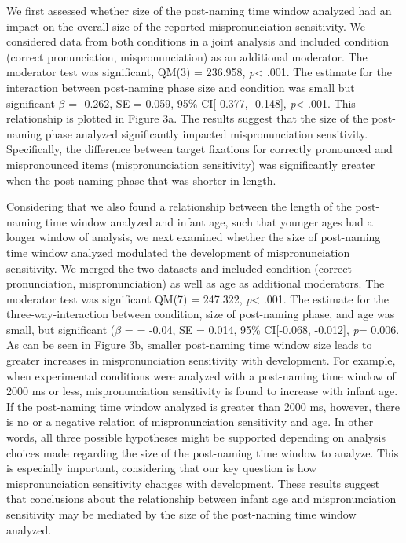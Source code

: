 \documentclass[man]{apa6}
\theoremstyle{definition}
\theoremstyle{definition}
\theoremstyle{definition}
\theoremstyle{remark}
\begin{document}
We first assessed whether size of the post-naming time window analyzed
had an impact on the overall size of the reported mispronunciation
sensitivity. We considered data from both conditions in a joint analysis
and included condition (correct pronunciation, mispronunciation) as an
additional moderator. The moderator test was significant, QM(3) =
236.958, \emph{p}\textless{} .001. The estimate for the interaction
between post-naming phase size and condition was small but significant
\(\beta\) = -0.262, SE = 0.059, 95\% CI{[}-0.377, -0.148{]},
\emph{p}\textless{} .001. This relationship is plotted in Figure 3a. The
results suggest that the size of the post-naming phase analyzed
significantly impacted mispronunciation sensitivity. Specifically, the
difference between target fixations for correctly pronounced and
mispronounced items (mispronunciation sensitivity) was significantly
greater when the post-naming phase that was shorter in length.

Considering that we also found a relationship between the length of the
post-naming time window analyzed and infant age, such that younger ages
had a longer window of analysis, we next examined whether the size of
post-naming time window analyzed modulated the development of
mispronunciation sensitivity. We merged the two datasets and included
condition (correct pronunciation, mispronunciation) as well as age as
additional moderators. The moderator test was significant QM(7) =
247.322, \emph{p}\textless{} .001. The estimate for the
three-way-interaction between condition, size of post-naming phase, and
age was small, but significant (\(\beta\) = = -0.04, SE = 0.014, 95\%
CI{[}-0.068, -0.012{]}, \emph{p}= 0.006. As can be seen in Figure 3b,
smaller post-naming time window size leads to greater increases in
mispronunciation sensitivity with development. For example, when
experimental conditions were analyzed with a post-naming time window of
2000 ms or less, mispronunciation sensitivity is found to increase with
infant age. If the post-naming time window analyzed is greater than 2000
ms, however, there is no or a negative relation of mispronunciation
sensitivity and age. In other words, all three possible hypotheses might
be supported depending on analysis choices made regarding the size of
the post-naming time window to analyze. This is especially important,
considering that our key question is how mispronunciation sensitivity
changes with development. These results suggest that conclusions about
the relationship between infant age and mispronunciation sensitivity may
be mediated by the size of the post-naming time window analyzed.
\end{document}
